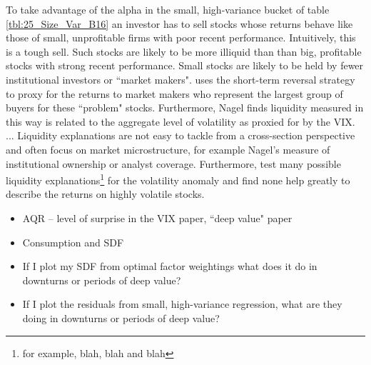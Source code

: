 To take advantage of the alpha in the small, high-variance bucket of table
\ref{tbl:25_Size_Var_B16} an investor has to sell stocks whose returns behave
like those of small, unprofitable firms with poor recent performance.
Intuitively, this is a tough sell.
Such stocks are likely to be more illiquid than than big, profitable stocks
with strong recent performance.
Small stocks are likely to be held by fewer institutional investors or
``market makers".
\textcite{nagel2012evaporating} uses the short-term reversal strategy to proxy
for the returns to market makers who represent the largest group of buyers for
these ``problem" stocks.
Furthermore, Nagel finds liquidity measured in this way is related to the
aggregate level of volatility as proxied for by the VIX.
\textcite{nagel2005short} ...
Liquidity explanations are not easy to tackle from a cross-section
perspective and often focus on market microstructure, for example Nagel's
measure of institutional ownership or analyst coverage.
Furthermore, \textcite{ang2006cross} test many possible liquidity
explanations\footnote{for example, blah, blah and blah}
for the volatility anomaly and find none help greatly to describe the returns
on highly volatile stocks.

\begin{itemize}
  \item AQR -- level of surprise in the VIX paper, ``deep value" paper
  \item Consumption and SDF
  \item If I plot my SDF from optimal factor weightings what does it do in
  downturns or periods of deep value?
  \item If I plot the residuals from small, high-variance regression, what are
  they doing in downturns or periods of deep value?
\end{itemize}
